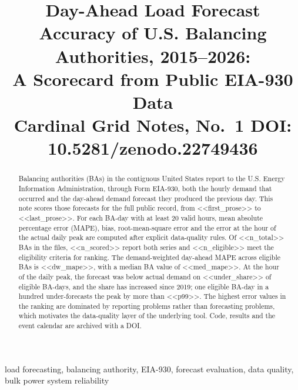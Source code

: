\documentclass[conference]{IEEEtran}
\begin{document}
\title{Day-Ahead Load Forecast Accuracy of U.S. Balancing Authorities, 2015--2026:\\ A Scorecard from Public EIA-930 Data\\
\large Cardinal Grid Notes, No.\ 1 \quad DOI: 10.5281/zenodo.22749436}

\author{
}

\maketitle

\begin{abstract}
Balancing authorities (BAs) in the contiguous United States report to the U.S. Energy Information Administration, through Form EIA-930, both the hourly demand that occurred and the day-ahead demand forecast they produced the previous day. This note scores those forecasts for the full public record, from <<first_prose>> to <<last_prose>>. For each BA-day with at least 20 valid hours, mean absolute percentage error (MAPE), bias, root-mean-square error and the error at the hour of the actual daily peak are computed after explicit data-quality rules. Of <<n_total>> BAs in the files, <<n_scored>> report both series and <<n_eligible>> meet the eligibility criteria for ranking. The demand-weighted day-ahead MAPE across eligible BAs is <<dw_mape>>, with a median BA value of <<med_mape>>. At the hour of the daily peak, the forecast was below actual demand on <<under_share>> of eligible BA-days, and the share has increased since 2019; one eligible BA-day in a hundred under-forecasts the peak by more than <<p99>>. The highest error values in the ranking are dominated by reporting problems rather than forecasting problems, which motivates the data-quality layer of the underlying tool. Code, results and the event calendar are archived with a DOI.
\end{abstract}

\begin{IEEEkeywords}
load forecasting, balancing authority, EIA-930, forecast evaluation, data quality, bulk power system reliability
\end{IEEEkeywords}
\end{document}

